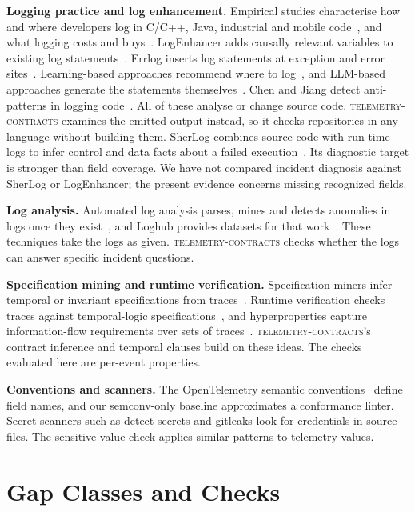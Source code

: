 \documentclass[conference]{IEEEtran}
\newcommand{\tool}{\textsc{telemetry-contracts}\xspace}
\begin{document}
\textbf{Logging practice and log enhancement.} Empirical studies characterise how and where developers log in C/C++, Java, industrial and mobile code~\cite{yuan2012characterizing,chen2017replication,fu2014where,zeng2019mobile}, and what logging costs and buys~\cite{li2021qualitative}. LogEnhancer adds causally relevant variables to existing log statements~\cite{yuan2011logenhancer}. Errlog inserts log statements at exception and error sites~\cite{yuan2012conservative}. Learning-based approaches recommend where to log~\cite{zhu2015learning,li2020where}, and LLM-based approaches generate the statements themselves~\cite{xu2024unilog,li2023llmlogging}. Chen and Jiang detect anti-patterns in logging code~\cite{chen2017antipatterns}. All of these analyse or change source code. \tool examines the emitted output instead, so it checks repositories in any language without building them. SherLog combines source code with run-time logs to infer control and data facts about a failed execution~\cite{yuan2010sherlog}. Its diagnostic target is stronger than field coverage. We have not compared incident diagnosis against SherLog or LogEnhancer; the present evidence concerns missing recognized fields.

\textbf{Log analysis.} Automated log analysis parses, mines and detects anomalies in logs once they exist~\cite{he2021survey,zhu2019parsing}, and Loghub provides datasets for that work~\cite{zhu2023loghub}. These techniques take the logs as given. \tool checks whether the logs can answer specific incident questions.

\textbf{Specification mining and runtime verification.} Specification miners infer temporal or invariant specifications from traces~\cite{ammons2002mining,ernst2007daikon,legoues2009specmining}. Runtime verification checks traces against temporal-logic specifications~\cite{leucker2009brief,bauer2011ltl}, and hyperproperties capture information-flow requirements over sets of traces~\cite{clarkson2010hyperproperties}. \tool's contract inference and temporal clauses build on these ideas. The checks evaluated here are per-event properties.

\textbf{Conventions and scanners.} The OpenTelemetry semantic conventions~\cite{otel-semconv} define field names, and our semconv-only baseline approximates a conformance linter. Secret scanners such as detect-secrets and gitleaks look for credentials in source files. The sensitive-value check applies similar patterns to telemetry values.

\section{Gap Classes and Checks}\label{sec:classes}
\end{document}
